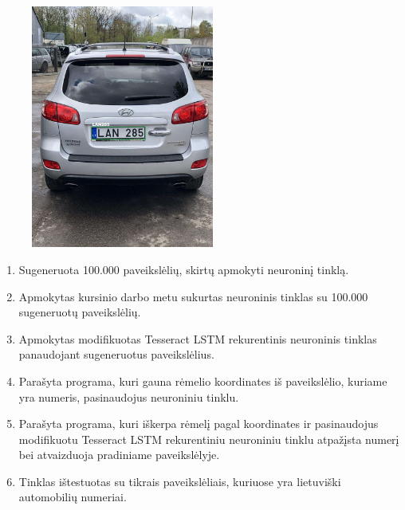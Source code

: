 \documentclass{VUMIFInfBakalaurinis}
\begin{document}
\begin{subfigure}{\linewidth}
  \centering
  \includegraphics[width=6cm]{cars/lan285.jpg}
  \label{LAN285}
\end{subfigure}



\pagebreak
{}
\begin{enumerate}[itemsep=0.5pt]%
  \item Sugeneruota 100.000 paveikslėlių, skirtų apmokyti neuroninį tinklą.
  \item Apmokytas kursinio darbo metu sukurtas neuroninis tinklas su 100.000 sugeneruotų paveikslėlių.
  \item Apmokytas modifikuotas Tesseract LSTM rekurentinis neuroninis tinklas panaudojant sugeneruotus paveikslėlius.
  \item Parašyta programa, kuri gauna rėmelio koordinates iš paveikslėlio, kuriame yra numeris, pasinaudojus neuroniniu tinklu.
  \item Parašyta programa, kuri iškerpa rėmelį pagal koordinates ir pasinaudojus modifikuotu Tesseract LSTM rekurentiniu neuroniniu tinklu atpažįsta numerį bei atvaizduoja pradiniame paveikslėlyje.
  \item Tinklas ištestuotas su tikrais paveikslėliais, kuriuose yra lietuviški automobilių numeriai.
\end{enumerate}
\end{document}

